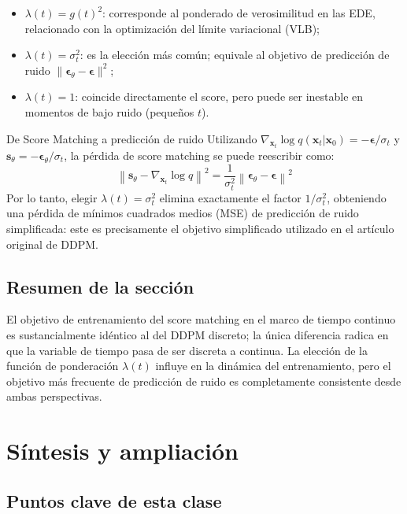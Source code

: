\documentclass[a4paper]{article}
\begin{document}
\begin{itemize}
    \item $\lambda(t) = g(t)^2$: corresponde al ponderado de verosimilitud en las EDE, relacionado con la optimización del límite variacional (VLB);
    \item $\lambda(t) = \sigma_t^2$: es la elección más común; equivale al objetivo de predicción de ruido $\|\boldsymbol{\epsilon}_\theta - \boldsymbol{\epsilon}\|^2$;
    \item $\lambda(t) = 1$: coincide directamente el score, pero puede ser inestable en momentos de bajo ruido (pequeños $t$).
\end{itemize}

\begin{knowledgebox}{De Score Matching a predicción de ruido}
Utilizando $\nabla_{\mathbf{x}_t}\log q(\mathbf{x}_t|\mathbf{x}_0) = -\boldsymbol{\epsilon}/\sigma_t$ y $\mathbf{s}_\theta = -\boldsymbol{\epsilon}_\theta / \sigma_t$, la pérdida de score matching se puede reescribir como:
$$
\left\|\mathbf{s}_\theta - \nabla_{\mathbf{x}_t}\log q\right\|^2 = \frac{1}{\sigma_t^2}\left\|\boldsymbol{\epsilon}_\theta - \boldsymbol{\epsilon}\right\|^2
$$
Por lo tanto, elegir $\lambda(t) = \sigma_t^2$ elimina exactamente el factor $1/\sigma_t^2$, obteniendo una pérdida de mínimos cuadrados medios (MSE) de predicción de ruido simplificada: este es precisamente el objetivo simplificado utilizado en el artículo original de DDPM.
\end{knowledgebox}

\subsection{Resumen de la sección}

El objetivo de entrenamiento del score matching en el marco de tiempo continuo es sustancialmente idéntico al del DDPM discreto; la única diferencia radica en que la variable de tiempo pasa de ser discreta a continua. La elección de la función de ponderación $\lambda(t)$ influye en la dinámica del entrenamiento, pero el objetivo más frecuente de predicción de ruido es completamente consistente desde ambas perspectivas.
\section{Síntesis y ampliación}

\subsection{Puntos clave de esta clase}
\end{document}
